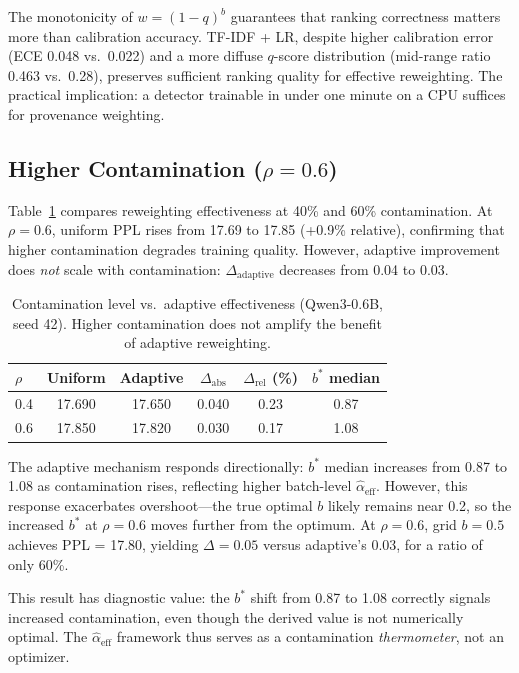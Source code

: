 \documentclass[11pt]{article}
\begin{document}
The monotonicity of $w = (1-q)^b$ guarantees that ranking correctness matters more than calibration accuracy.
TF-IDF + LR, despite higher calibration error (ECE 0.048 vs.\ 0.022) and a more diffuse $q$-score distribution (mid-range ratio 0.463 vs.\ 0.28), preserves sufficient ranking quality for effective reweighting.
The practical implication: a detector trainable in under one minute on a CPU suffices for provenance weighting.

\subsection{Higher Contamination ($\rho = 0.6$)}
\label{sec:rho06}

Table~\ref{tab:rho06} compares reweighting effectiveness at 40\% and 60\% contamination.
At $\rho = 0.6$, uniform PPL rises from 17.69 to 17.85 (+0.9\% relative), confirming that higher contamination degrades training quality.
However, adaptive improvement does \emph{not} scale with contamination: $\Delta_{\mathrm{adaptive}}$ decreases from 0.04 to 0.03.

\begin{table}[t]
\centering
\caption{Contamination level vs.\ adaptive effectiveness (Qwen3-0.6B, seed 42). Higher contamination does not amplify the benefit of adaptive reweighting.}
\label{tab:rho06}
\small
\begin{tabular}{lccccc}
\toprule
$\rho$ & Uniform & Adaptive & $\Delta_{\mathrm{abs}}$ & $\Delta_{\mathrm{rel}}$ (\%) & $b^*$ median \\
\midrule
0.4 & 17.690 & 17.650 & 0.040 & 0.23 & 0.87 \\
0.6 & 17.850 & 17.820 & 0.030 & 0.17 & 1.08 \\
\bottomrule
\end{tabular}
\end{table}

The adaptive mechanism responds directionally: $b^*$ median increases from 0.87 to 1.08 as contamination rises, reflecting higher batch-level $\hat{\alpha}_{\mathrm{eff}}$.
However, this response exacerbates overshoot---the true optimal $b$ likely remains near 0.2, so the increased $b^*$ at $\rho = 0.6$ moves further from the optimum.
At $\rho = 0.6$, grid $b = 0.5$ achieves PPL = 17.80, yielding $\Delta = 0.05$ versus adaptive's 0.03, for a ratio of only 60\%.

This result has diagnostic value: the $b^*$ shift from 0.87 to 1.08 correctly signals increased contamination, even though the derived value is not numerically optimal.
The $\hat{\alpha}_{\mathrm{eff}}$ framework thus serves as a contamination \emph{thermometer}, not an optimizer.
\end{document}
